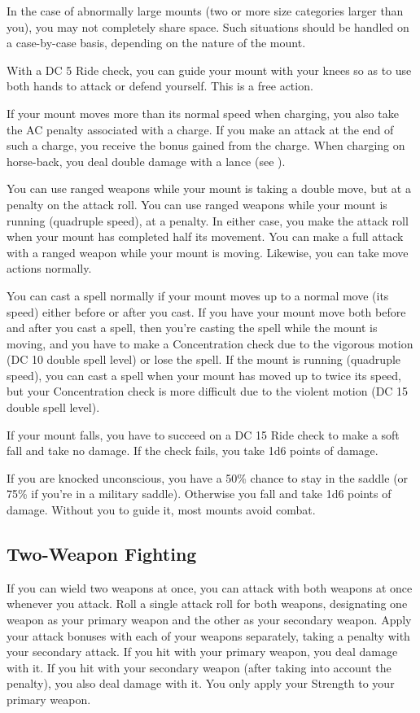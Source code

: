 In the case of abnormally large mounts (two or more size categories larger than you), you may not completely share space. Such situations should be handled on a case-by-case basis, depending on the nature of the mount.

 With a DC 5 Ride check, you can guide your mount with your knees so as to use both hands to attack or defend yourself. This is a free action.

If your mount moves more than its normal speed when charging, you also take the AC penalty associated with a charge. If you make an attack at the end of such a charge, you receive the bonus gained from the charge. When charging on horse-back, you deal double damage with a lance (see ).

You can use ranged weapons while your mount is taking a double move, but at a  penalty on the attack roll. You can use ranged weapons while your mount is running (quadruple speed), at a  penalty. In either case, you make the attack roll when your mount has completed half its movement. You can make a full attack with a ranged weapon while your mount is moving. Likewise, you can take move actions normally.

 You can cast a spell normally if your mount moves up to a normal move (its speed) either before or after you cast. If you have your mount move both before and after you cast a spell, then you're casting the spell while the mount is moving, and you have to make a Concentration check due to the vigorous motion (DC 10 \add double spell level) or lose the spell. If the mount is running (quadruple speed), you can cast a spell when your mount has moved up to twice its speed, but your Concentration check is more difficult due to the violent motion (DC 15 \add double spell level).

 If your mount falls, you have to succeed on a DC 15 Ride check to make a soft fall and take no damage. If the check fails, you take 1d6 points of damage.

 If you are knocked unconscious, you have a 50\% chance to stay in the saddle (or 75\% if you're in a military saddle). Otherwise you fall and take 1d6 points of damage. Without you to guide it, most mounts avoid combat.

\subsection{Two-Weapon Fighting}\label{Two-Weapon Fighting}
If you can wield two weapons at once, you can attack with both weapons at once whenever you attack. Roll a single attack roll for both weapons, designating one weapon as your primary weapon and the other as your secondary weapon. Apply your attack bonuses with each of your weapons separately, taking a  penalty with your secondary attack. If you hit with your primary weapon, you deal damage with it. If you hit with your secondary weapon (after taking into account the  penalty), you also deal damage with it. You only apply your Strength to your primary weapon.

